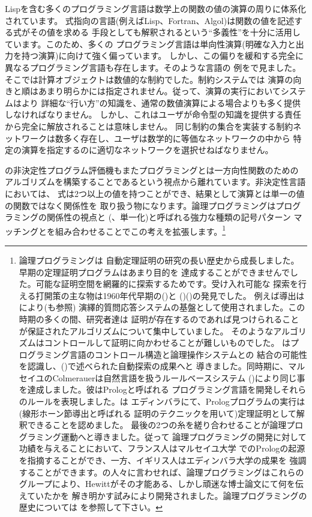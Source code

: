Lispを含む多くのプログラミング言語は数学上の関数の値の演算の周りに体系化されています。
式指向の言語(例えばLisp、Fortran、Algol)は関数の値を記述する式がその値を求める
手段としても解釈されるという``多義性''を十分に活用しています。このため、多くの
プログラミング言語は単向性演算(明確な入力と出力を持つ演算)に向けて強く偏っています。
しかし、この偏りを緩和する完全に異なるプログラミング言語も存在します。そのような言語の
例をで見ました。そこでは計算オブジェクトは数値的な制約でした。制約システムでは
演算の向きと順はあまり明らかには指定されません。従って、演算の実行においてシステムはより
詳細な``行い方''の知識を、通常の数値演算による場合よりも多く提供しなければなりません。
しかし、これはユーザが命令型の知識を提供する責任から完全に解放されることは意味しません。
同じ制約の集合を実装する制約ネットワークは数多く存在し、ユーザは数学的に等価なネットワークの中から
特定の演算を指定するのに適切なネットワークを選択せねばなりません。

の非決定性プログラム評価機もまたプログラミングとは一方向性関数のための
アルゴリズムを構築することであるという視点から離れています。非決定性言語においては、
式は2つ以上の値を持つことができ、結果として演算とは単一の値の関数ではなく関係性を
取り扱う物になります。論理プログラミングはプログラミングの関係性の視点と
(、単一化)と呼ばれる強力な種類の記号パターン
マッチングとを組み合わせることでこの考えを拡張します。\footnote{論理プログラミングは
自動定理証明の研究の長い歴史から成長しました。早期の定理証明プログラムはあまり目的を
達成することができませんでした。可能な証明空間を網羅的に探索するためです。受け入れ可能な
探索を行える打開策の主な物は1960年代早期の()と
()()の発見でした。
例えば導出はにより(も参照)
演繹的質問応答システムの基盤として使用されました。この時期の多くの間、研究者達は
証明が存在するのであれば見つけられることが保証されたアルゴリズムについて集中していました。
そのようなアルゴリズムはコントロールして証明に向かわせることが難しいものでした。
はプログラミング言語のコントロール構造と論理操作システムとの
結合の可能性を認識し、()で述べられた自動探索の成果へと
導きました。同時期に、マルセイユのColmerauerは自然言語を扱うルールベースシステム
()により同じ事を達成しました。彼はPrologと呼ばれる
プログラミング言語を開発しそれらのルールを表現しました。は
エディンバラにて、Prologプログラムの実行は(線形ホーン節導出と呼ばれる
証明のテクニックを用いて)定理証明として解釈できることを認めました。
最後の2つの糸を縒り合わせることが論理プログラミング運動へと導きました。従って
論理プログラミングの開発に対して功績を与えることにおいて、フランス人はマルセイユ大学
でのPrologの起源を指摘することができ、一方、イギリス人はエディンバラ大学の成果を
強調することができます。の人々に言わせれば、論理プログラミングはこれらの
グループにより、Hewittがその才能ある、しかし頑迷な博士論文にて何を伝えていたかを
解き明かす試みにより開発されました。論理プログラミングの歴史については
を参照して下さい。}

